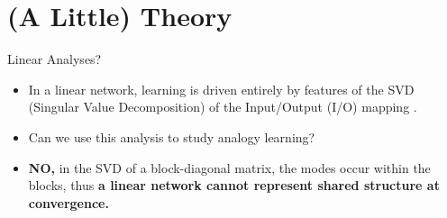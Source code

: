 \documentclass{beamer}
\begin{document}
\section{(A Little) Theory}
\begin{frame}{Linear Analyses?}
\begin{itemize}
    \item<1-> In a linear network, learning is driven entirely by features of the SVD (Singular Value Decomposition) of the Input/Output (I/O) mapping \cite{Saxe2013}.
    \item<2-> Can we use this analysis to study analogy learning?
    \item<3-> \textbf{NO,} in the SVD of a block-diagonal matrix, the modes occur within the blocks, thus \textbf{a linear network cannot represent shared structure at convergence.}
\end{itemize}
\end{frame}
\end{document}
